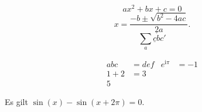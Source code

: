 \documentclass{article}
\begin{document}
\[
  ax^2+bx+c=0
\]
\ShowMathMLObj
\[
  x = \frac{-b \pm \sqrt{b^2-4ac}}{2a}.
\]
\[
  \sum_a\underline c\dot bc'
\]

\begin{align}
  abc&=def & e^{\mathrm{i}\pi}&=-1\\
  1+2&=3\\
  5
\end{align}
\ShowMathMLObj

Es gilt $\sin(x)-\sin(x+2\pi)=0$.
\end{document}

